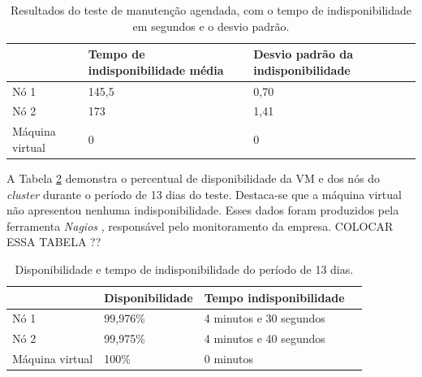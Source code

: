 \begin{table}[h!]
\caption{Resultados do teste de manutenção agendada, com o tempo de indisponibilidade em segundos e o desvio padrão.}
\label{tab:teste3resultados}
\begin{center}
\begin{tabular}{|l|l|l|}\hline
 & \textbf{Tempo de indisponibilidade média} & \textbf{Desvio padrão da indisponibilidade} \\\hline
Nó 1 & 145,5 & 0,70 \\\hline
Nó 2 & 173 & 1,41 \\\hline
Máquina virtual & 0 & 0 \\\hline
\end{tabular}
\end{center}
\end{table}

A Tabela \ref{tab:teste3disp} demonstra o percentual de disponibilidade da \ac{VM} e dos nós do \textit{cluster} durante o período de 13 dias
do teste. Destaca-se que a máquina virtual não apresentou nenhuma indisponibilidade. 
Esses dados foram produzidos pela ferramenta \textit{Nagios} \cite{nagios}, responsável pelo monitoramento da empresa.
COLOCAR ESSA TABELA ??

\begin{table}[h!]
\caption{Disponibilidade e tempo de indisponibilidade do período de 13 dias.}
\label{tab:teste3disp}
\begin{center}
\begin{tabular}{|l|l|p{4cm}|l|}\hline
 & \textbf{Disponibilidade} & \textbf{Tempo indisponibilidade} \\\hline
Nó 1 & 99,976\% & 4 minutos e 30 segundos \\\hline
Nó 2 & 99,975\% & 4 minutos e 40 segundos \\\hline
Máquina virtual & 100\% & 0 minutos \\\hline
\end{tabular}
\end{center}
\end{table}


